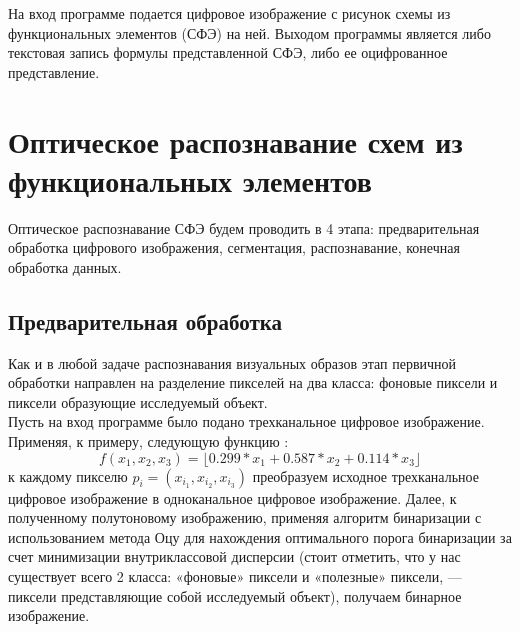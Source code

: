 \documentclass[makeidx, a4paper, 14pt]{extarticle}
\begin{document}
На вход программе подается цифровое изображение с рисунок схемы из функциональных элементов (СФЭ) на ней. Выходом программы является либо текстовая
запись формулы представленной СФЭ, либо ее оцифрованное представление.

\section{Оптическое распознавание схем из функциональных элементов}

Оптическое распознавание СФЭ будем проводить в 4 этапа: предварительная обработка цифрового изображения, сегментация, распознавание, конечная обработка данных.

\subsection{Предварительная обработка}

Как и в любой задаче распознавания визуальных образов этап первичной обработки направлен на разделение пикселей на два класса: фоновые пиксели и
пиксели образующие исследуемый объект. \\

Пусть на вход программе было подано трехканальное цифровое изображение. Применяя, к примеру, следующую функцию \cite{grayscale_luma}:
\[ f(x_1, x_2, x_3) = \lfloor 0.299 * x_1 + 0.587 * x_2 + 0.114 * x_3 \rfloor \] к каждому пикселю
$p_i=({x_{i_1}}, {x_{i_2}}, {x_{i_3}})$ преобразуем исходное трехканальное цифровое изображение в одноканальное цифровое изображение.
Далее, к полученному полутоновому изображению, применяя алгоритм бинаризации с использованием метода Оцу \cite{otsu79} для нахождения оптимального порога бинаризации за счет
минимизации внутриклассовой дисперсии (стоит отметить, что у нас существует всего 2 класса: «фоновые» пиксели и «полезные» пиксели, --- пиксели представляющие собой исследуемый объект),
получаем бинарное изображение.
\end{document}

